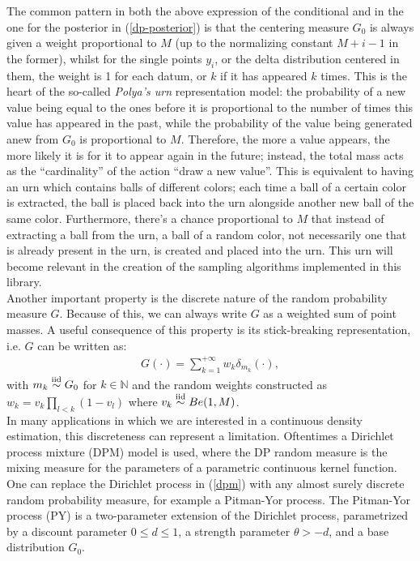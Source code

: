 The common pattern in both the above expression of the conditional and in the one for the posterior in (\ref{dp-posterior}) is that the centering measure $G_0$ is always given a weight proportional to $M$ (up to the normalizing constant $M+i-1$ in the former), whilst for the single points $y_i$, or the delta distribution centered in them, the weight is 1 for each datum, or $k$ if it has appeared $k$ times.
This is the heart of the so-called \emph{Polya's urn} representation model: the probability of a new value being equal to the ones before it is proportional to the number of times this value has appeared in the past, while the probability of the value being generated anew from $G_0$ is proportional to $M$.
Therefore, the more a value appears, the more likely it is for it to appear again in the future; instead, the total mass acts as the  ``cardinality'' of the action ``draw a new value''.
This is equivalent to having an urn which contains balls of different colors; each time a ball of a certain color is extracted, the ball is placed back into the urn alongside another new ball of the same color.
Furthermore, there's a chance proportional to $M$ that instead of extracting a ball from the urn, a ball of a random color, not necessarily one that is already present in the urn, is created and placed into the urn.
This urn will become relevant in the creation of the sampling algorithms implemented in this library. 
\\
Another important property is the discrete nature of the random probability measure $G$.
Because of this, we can always write $G$ as a weighted sum of point masses.
A useful consequence of this property is its stick-breaking representation, i.e. $G$ can be written as:
\begin{align*}
	G(\cdot) = \sum_{k=1}^{+\infty} w_k \delta_{m_k} (\cdot),
\end{align*}
with $m_k \stackrel{\text{iid}}{\sim} G_0$ for $k\in\mathbb{N}$ and the random weights constructed as $w_k =v_k\prod\limits_{l<k} (1-v_l)$ where $v_k \stackrel{\text{iid}}{\sim} Be(1,M)$. \\
In many applications in which we are interested in a continuous density estimation, this discreteness can represent a limitation.
Oftentimes a Dirichlet process mixture (DPM) model is used, where the DP random measure is the mixing measure for the parameters of a parametric continuous kernel function.
One can replace the Dirichlet process in (\ref{dpm}) with any almost surely discrete random probability measure, for example a Pitman-Yor process.
The Pitman-Yor process (PY) is a two-parameter extension of the Dirichlet process, parametrized by a discount parameter $0 \leq d \leq 1$, a strength parameter $\theta > -d$, and a base distribution $G_0$. 
